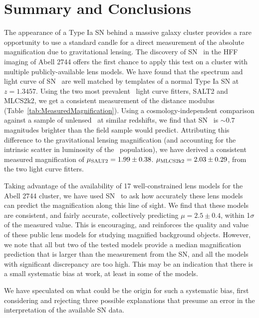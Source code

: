 \section{Summary and Conclusions}
\label{sec:SummaryAndConclusions}

The appearance of a Type Ia SN behind a massive galaxy cluster
provides a rare opportunity to use a standard candle for a direct
measurement of the absolute magnification due to gravitational
lensing.  The discovery of SN \tomas\ in the HFF imaging of Abell 2744
offers the first chance to apply this test on a cluster with multiple
publicly-available lens models.  We have found that the spectrum and
light curve of SN \tomas\ are well matched by templates of a normal
Type Ia SN at $z=1.3457$.  Using the two most prevalent \SNIa\ light
curve fitters, SALT2 and MLCS2k2, we get a consistent measurement of
the distance modulus (Table~\ref{tab:MeasuredMagnification}).  Using a
cosmology-independent comparison against a sample of unlensed \SNeIa\
at similar redshifts, we find that SN \tomas\ is $\sim0.7$ magnitudes
brighter than the field sample would predict.  Attributing this
difference to the gravitational lensing magnification (and accounting
for the intrinsic scatter in luminosity of the \SNIa\ population), we
have derived a consistent measured magnification of $\mu_{\rm
SALT2}=1.99\pm0.38$.  $\mu_{\rm MLCS2k2}=2.03\pm0.29$, from the two
light curve fitters.

Taking advantage of the availability of 17 well-constrained lens
models for the Abell 2744 cluster, we have used SN \tomas\ to ask how
accurately these lens models can predict the magnification along this
line of sight.  We find that these models are consistent, and fairly
accurate, collectively predicting $\mu=2.5\pm0.4$, within 1$\sigma$ of
the measured value.  This is encouraging, and reinforces the quality
and value of these public lens models for studying magnified
background objects.  However, we note that all but two of the tested
models provide a median magnification prediction that is larger than
the measurement from the SN, and all the models with significant
discrepancy are too high.  This may be an indication that there is a
small systematic bias at work, at least in some of the models. 

We have speculated on what could be the origin for such a systematic
bias, first considering and rejecting three possible explanations that
presume an error in the interpretation of the available SN data.

